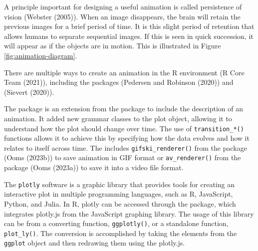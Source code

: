 A principle important for designing a useful animation is called persistence of vision (Webster (2005)). When an image disappears, the brain will retain the previous images for a brief period of time. It is this slight period of retention that allows humans to separate sequential images. If this is seen in quick succession, it will appear as if the objects are in motion. This is illustrated in Figure \ref{fig:animation-diagram}.

There are multiple ways to create an animation in the R environment (R Core Team (2021)), including the packages  (Pedersen and Robinson (2020)) and  (Sievert (2020)).

The  package is an extension from the  package to include the description of an animation. It added new grammar classes to the plot object, allowing it to understand how the plot should change over time. The use of \texttt{transition\_*()} functions allows it to achieve this by specifying how the data evolves and how it relates to itself across time. The  includes \texttt{gifski\_renderer()} from the  package (Ooms (2023b)) to save animation in GIF format or \texttt{av\_renderer()} from the  package (Ooms (2023a)) to save it into a video file format.

The \texttt{plotly} software is a graphic library that provides tools for creating an interactive plot in multiple programming languages, such as R, JavaScript, Python, and Julia. In R, plotly can be accessed through the  package, which integrates plotly.js from the JavaScript graphing library. The usage of this library can be from a converting function, \texttt{ggplotly()}, or a standalone function, \texttt{plot\_ly()}. The conversion is accomplished by taking the elements from the \texttt{ggplot} object and then redrawing them using the plotly.js.

